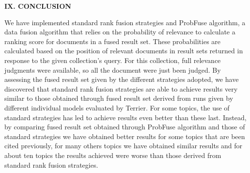 \documentclass[12pt,journal]{IEEEtran}
\begin{document}
\textbf{IX.	CONCLUSION}

We have implemented standard rank fusion strategies and ProbFuse algorithm, a data fusion algorithm that relies on the probability of relevance to calculate a ranking score for documents in a fused result set.
These probabilities are calculated based on the position of relevant documents in result sets returned in response to the given collection’s query. For this collection, full relevance judgments were available, so all the document were just been judged. 
By assessing the fused result set given by the different strategies adopted, we have discovered that standard rank fusion strategies are able to achieve results very similar to those obtained through fused result set derived from runs given by different individual models evaluated by Terrier. For some topics, the use of standard strategies has led to achieve results even better than these last. Instead, by comparing fused result set obtained through ProbFuse algorithm and those of standard strategies we have obtained better results for some topics that are been cited previously, for many others topics we have obtained similar results and for about ten topics the results achieved were worse than those derived from standard rank fusion strategies.

\end{document}
